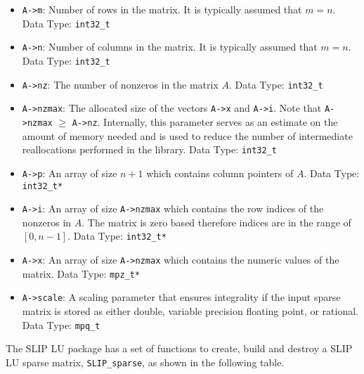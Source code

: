 \documentclass[12pt]{article}
\theoremstyle{definition}
\begin{document}
\begin{itemize}
\item \verb|A->m|: Number of rows in the matrix. It is typically assumed that
$m=n$.  Data Type: \verb|int32_t|

\item \verb|A->n|: Number of columns in the matrix. It is typically assumed
that $m=n$. Data Type: \verb|int32_t|

\item \verb|A->nz|: The number of nonzeros in the matrix $A$. Data Type:
\verb|int32_t|

\item \verb|A->nzmax|: The allocated size of the vectors \verb|A->x| and
\verb|A->i|. Note that \verb|A->nzmax| $\geq$ \verb|A->nz|. Internally, this
parameter serves as an estimate on the amount of memory needed and is used to
reduce the number of intermediate reallocations performed in the library. Data
Type: \verb|int32_t|

\item \verb|A->p|: An array of size $n+1$ which contains column pointers of
$A$. Data Type: \verb|int32_t*|

\item \verb|A->i|: An array of size \verb|A->nzmax| which contains the row
indices of the nonzeros in $A$. The matrix is zero based therefore indices are
in the range of $[0, n-1]$. Data Type: \verb|int32_t*|

\item \verb|A->x|: An array of size \verb|A->nzmax| which contains the numeric
values of the matrix. Data Type: \verb|mpz_t*|

\item \verb|A->scale|: A scaling parameter that ensures integrality if the
input sparse matrix is stored as either double, variable precision floating
point, or rational. Data Type: \verb|mpq_t|

\end{itemize}

The SLIP LU package has a set of functions to create, build and destroy a SLIP
LU sparse matrix, \verb|SLIP_sparse|, as shown in the following table.
\end{document}
